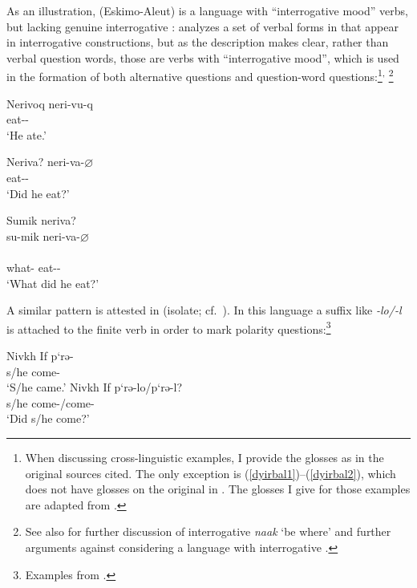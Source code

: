\documentclass[output=paper]{langsci/langscibook}
\begin{document}
As an illustration,  (Eskimo-Aleut) is a language with
``interrogative mood'' verbs, but lacking genuine interrogative :
\citet[199]{sadock1984} analyzes a set of verbal forms in  that
appear in interrogative constructions, but as the description makes clear,
rather than verbal question words, those are verbs with ``interrogative mood'',
which is used in the formation of both alternative questions and question-word
questions:\footnote{When discussing cross-linguistic examples, I provide the
glosses as in the original sources cited. The only exception is 
(\ref{dyirbal1})--(\ref{dyirbal2}), which does not have glosses on the original in
\citet{Dixon1972}. The glosses I give for those examples are adapted from
\citet{hagege2008}.}\textsuperscript{,}%
\footnote{See also \citet{hagege2008} for further
discussion of interrogative \emph{naak} `be where' and further arguments
against considering  a language with interrogative .}

\begin{exe}
    \ex\label{WG1} %
    \sn     Nerivoq%
    \sn\gll neri-vu-q\\
            eat-\Indic{}-\Tsg{}\\
    \glt `He ate.'

    \ex\label{WG2} 
    \sn     Neriva?
    \sn\gll neri-va-$\varnothing$\\
            eat-\Int{}-\Tsg{}\\
    \glt    `Did he eat?'

    \ex \label{WG3} 
    \sn\gll Sumik neriva? \\
            su-mik neri-va-$\varnothing$\\ \hfill \\
            what-\Ins{} eat-\Int{}-\Tsg{}\\
    \glt `What did he eat?'
\end{exe}

A similar pattern is attested in  (isolate; cf.\
\citealt{gruzdeva1998,nedjalkov.otaina2013}). In this language a suffix like
\emph{-lo/-l} is attached to the finite verb in order to mark polarity
questions:\footnote{Examples from \citet[116 and 137]{nedjalkov.otaina2013}.}

\begin{exe}
\ex\label{nivkh1} Nivkh
    \sn\gll If	p‘rə-\\
            s/he come-\Ind{}\\
            \glt `S/he came.'
\ex\label{nivkh2} Nivkh
    \sn\gll If	p‘rə-lo/p‘rə-l?\\
            s/he come-\glossQ{}/come-\glossQ{} \\
            \glt `Did s/he come?'
\end{exe}
%
\end{document}
